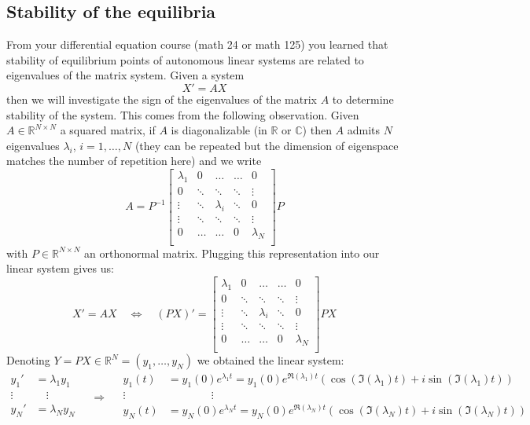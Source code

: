 \subsection{Stability of the equilibria} From your differential equation course (math 24 or math 125) you learned that stability of equilibrium points of autonomous linear systems are related to eigenvalues of the matrix system. Given a system 
\[X' = A X\]
then we will investigate the sign of the eigenvalues of the matrix $A$ to determine stability of the system. This comes from the following observation. Given $A \in \mathbb{R}^{N \times N}$ a squared matrix, if $A$ is diagonalizable (in $\mathbb{R}$ or $\mathbb{C}$) then $A$ admits $N$ eigenvalues $\lambda_i$, $i = 1 , \dots, N$ (they can be repeated but the dimension of eigenspace matches the number of repetition here) and we write 
\[A = P^{-1} \begin{bmatrix}
\lambda_1 & 0 & \dots & \dots  & 0  \\
0 & \ddots  & \ddots  & \ddots & \vdots  \\
 \vdots  & \ddots &\lambda_i & \ddots  & 0\\
  \vdots  & \ddots  &\ddots & \ddots  & \vdots \\
0   & \dots & \dots  & 0 &  \lambda_N \\
\end{bmatrix} P
\]
with $P\in \mathbb{R}^{N \times N}$ an orthonormal matrix. Plugging this representation into our linear system gives us:
\[ X' = A X \quad \Longleftrightarrow \quad  (PX)' =  \begin{bmatrix}
\lambda_1 & 0 & \dots & \dots  & 0  \\
0 & \ddots  & \ddots  & \ddots & \vdots  \\
 \vdots  & \ddots &\lambda_i & \ddots  & 0\\
  \vdots  & \ddots  &\ddots & \ddots  & \vdots \\
0   & \dots & \dots  & 0 &  \lambda_N \\
\end{bmatrix}  PX\]
Denoting $Y = PX \in \mathbb{R}^N = (y_1, \dots, y_N)$ we obtained the linear system:
\[
\begin{aligned}
 y_1' &= \lambda_1 y_1 \\
 \vdots & \quad \vdots  \\
 y_N' &= \lambda_N y_N \\
\end{aligned}
\quad  \Longrightarrow  \quad 
\begin{aligned}
  y_1(t)  &= y_1(0) e^{\lambda_1 t}=  y_1(0) e^{\Re(\lambda_1) t} (\cos (\Im(\lambda_1) t) + i \sin (\Im(\lambda_1) t) )\\
 \vdots & \qquad \qquad   \vdots  \\
 y_N(t) &= y_N(0) e^{\lambda_N t}=  y_N(0) e^{\Re(\lambda_N) t} (\cos (\Im(\lambda_N) t) + i \sin (\Im(\lambda_N) t) )\\
\end{aligned}
\]
